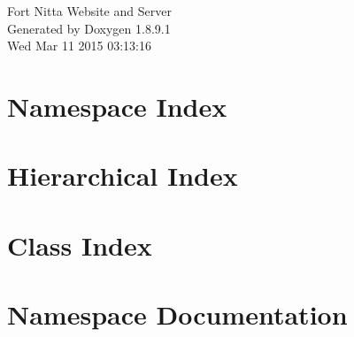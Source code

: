 \documentclass[twoside]{book}
\newcommand{\+}{\discretionary{\mbox{\scriptsize$\hookleftarrow$}}{}{}}
\newcommand{\clearemptydoublepage}{%
  \newpage{\pagestyle{empty}\cleardoublepage}%
}
\begin{document}
\hypersetup{pageanchor=false,
             bookmarks=true,
             bookmarksnumbered=true,
             pdfencoding=unicode
            }
\begin{titlepage}
\vspace*{7cm}
\begin{center}%
{\Large Fort Nitta Website and Server }\\
\vspace*{1cm}
{\large Generated by Doxygen 1.8.9.1}\\
\vspace*{0.5cm}
{\small Wed Mar 11 2015 03:13:16}\\
\end{center}
\end{titlepage}
\clearemptydoublepage
\tableofcontents
\clearemptydoublepage
{}
\hypersetup{pageanchor=true}

\chapter{Namespace Index}

\chapter{Hierarchical Index}

\chapter{Class Index}

\chapter{Namespace Documentation}












\end{document}
